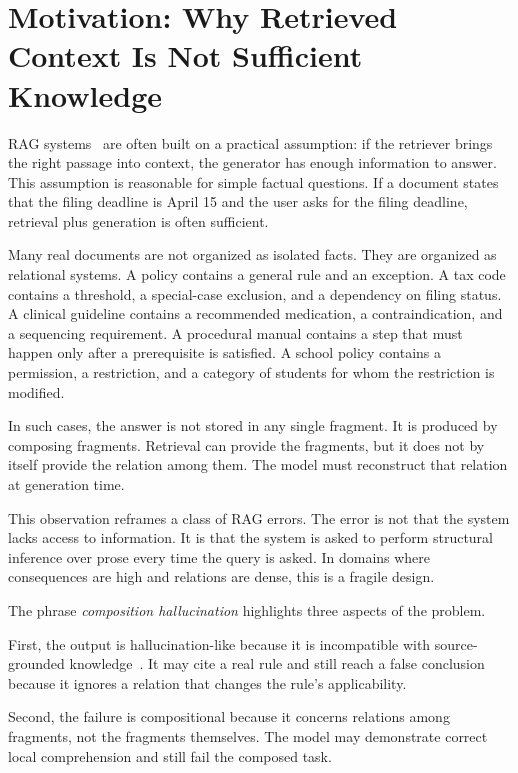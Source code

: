 \documentclass[11pt]{article}
\begin{document}
\section{Motivation: Why Retrieved Context Is Not Sufficient Knowledge}

RAG systems~\cite{lewis2020rag} are often built on a practical assumption: if the retriever brings the right passage into context, the generator has enough information to answer. This assumption is reasonable for simple factual questions. If a document states that the filing deadline is April 15 and the user asks for the filing deadline, retrieval plus generation is often sufficient.

Many real documents are not organized as isolated facts. They are organized as relational systems. A policy contains a general rule and an exception. A tax code contains a threshold, a special-case exclusion, and a dependency on filing status. A clinical guideline contains a recommended medication, a contraindication, and a sequencing requirement. A procedural manual contains a step that must happen only after a prerequisite is satisfied. A school policy contains a permission, a restriction, and a category of students for whom the restriction is modified.

In such cases, the answer is not stored in any single fragment. It is produced by composing fragments. Retrieval can provide the fragments, but it does not by itself provide the relation among them. The model must reconstruct that relation at generation time.

This observation reframes a class of RAG errors. The error is not that the system lacks access to information. It is that the system is asked to perform structural inference over prose every time the query is asked. In domains where consequences are high and relations are dense, this is a fragile design.

The phrase \emph{composition hallucination} highlights three aspects of the problem.

First, the output is hallucination-like because it is incompatible with source-grounded knowledge~\cite{maynez2020faithfulness,min2023factscore}. It may cite a real rule and still reach a false conclusion because it ignores a relation that changes the rule's applicability.

Second, the failure is compositional because it concerns relations among fragments, not the fragments themselves. The model may demonstrate correct local comprehension and still fail the composed task.
\end{document}
